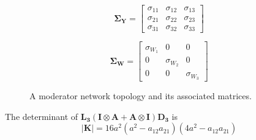 \documentclass{article}
\begin{document}
\begin{figure}[H]
\begin{minipage}[c]{0.25\textwidth}
\[
\mathbf{\Sigma_Y}=
\begin{bmatrix}
\sigma_{11} & \sigma_{12} & \sigma_{13} \\
\sigma_{21} & \sigma_{22} & \sigma_{23} \\
\sigma_{31} & \sigma_{32} & \sigma_{33}
\end{bmatrix}
\]

\end{minipage}%
\hspace{0.005\textwidth}%
\begin{minipage}[c]{0.27\textwidth}
\raggedright

\[
\mathbf{\Sigma_W}=
\begin{bmatrix}
\sigma_{W_1} & 0 & 0 \\
0 & \sigma_{W_2} & 0 \\
0 & 0 & \sigma_{W_3}
\end{bmatrix}
\]

\end{minipage}%

\caption{A moderator network topology and its associated matrices.}
\label{fig:network_moderator}
\end{figure}

The determinant of $\mathbf{L_3}(\mathbf{I} \otimes \mathbf{A} + \mathbf{A} \otimes \mathbf{I}) \mathbf{D_3}$ is
\begin{equation}
|\mathbf{K}| = 16a^{2}\left(a^{2}-a_{12}a_{21}\right)\left(4a^{2}-a_{12}a_{21}\right)
\end{equation}
\end{document}
